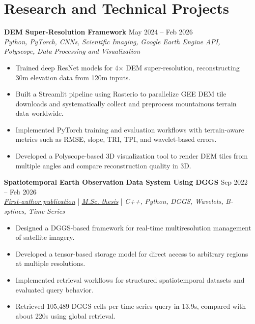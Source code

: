 \documentclass[a4paper,10pt]{article}
\begin{document}

\section*{Research and Technical Projects}

\noindent
\textbf{DEM Super-Resolution Framework} \hfill May 2024 -- Feb 2026 \\
\textit{Python, PyTorch, CNNs, Scientific Imaging, Google Earth Engine API, Polyscope, Data Processing and Visualization}
\begin{itemize}[leftmargin=0.25in]
    \item Trained deep ResNet models for 4$\times$ DEM super-resolution, reconstructing 30m elevation data from 120m inputs.
    \item Built a Streamlit pipeline using Rasterio to parallelize GEE DEM tile downloads and systematically collect and preprocess mountainous terrain data worldwide.
    \item Implemented PyTorch training and evaluation workflows with terrain-aware metrics such as RMSE, slope, TRI, TPI, and wavelet-based errors.
    \item Developed a Polyscope-based 3D visualization tool to render DEM tiles from multiple angles and compare reconstruction quality in 3D.
\end{itemize}

\noindent
\textbf{Spatiotemporal Earth Observation Data System Using DGGS} \hfill Sep 2022 -- Feb 2026 \\
\textit{\href{https://doi.org/10.3390/rs17040570}{First-author publication}} | \textit{\href{https://ucalgary.scholaris.ca/items/114b394b-e516-4732-bd3a-45dd6160d480}{M.Sc. thesis}} | \textit{C++, Python, DGGS, Wavelets, B-splines, Time-Series}
\begin{itemize}[leftmargin=0.25in]
    \item Designed a DGGS-based framework for real-time multiresolution management of satellite imagery.
    \item Developed a tensor-based storage model for direct access to arbitrary regions at multiple resolutions.
    \item Implemented retrieval workflows for structured spatiotemporal datasets and evaluated query behavior.
    \item Retrieved 105,489 DGGS cells per time-series query in 13.9s, compared with about 220s using global retrieval.
\end{itemize}
\end{document}
